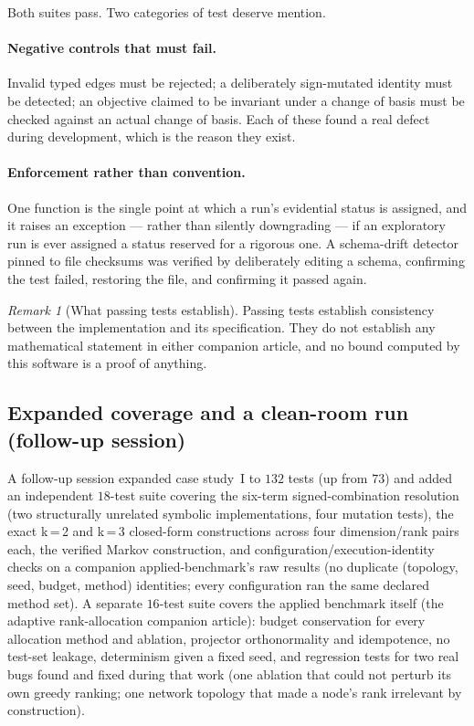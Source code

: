 \documentclass[11pt]{amsart}
\theoremstyle{remark}
\newtheorem{remark}{Remark}[section]
\begin{document}
Both suites pass. Two categories of test deserve mention.

\paragraph{Negative controls that must fail.} Invalid typed edges must be rejected; a
deliberately sign-mutated identity must be detected; an objective claimed to be invariant
under a change of basis must be checked against an actual change of basis. Each of these
found a real defect during development, which is the reason they exist.

\paragraph{Enforcement rather than convention.} One function is the single point at which a
run's evidential status is assigned, and it raises an exception --- rather than silently
downgrading --- if an exploratory run is ever assigned a status reserved for a rigorous one.
A schema-drift detector pinned to file checksums was verified by deliberately editing a
schema, confirming the test failed, restoring the file, and confirming it passed again.

\begin{remark}[What passing tests establish]
\label{rem:testscope}
Passing tests establish consistency between the implementation and its specification. They
do not establish any mathematical statement in either companion article, and no bound
computed by this software is a proof of anything.
\end{remark}

\subsection{Expanded coverage and a clean-room run (follow-up session)}

A follow-up session expanded case study~I to $132$ tests (up from $73$) and added an
independent $18$-test suite covering the six-term signed-combination resolution (two
structurally unrelated symbolic implementations, four mutation tests), the exact k\,=\,2
and k\,=\,3 closed-form constructions across four dimension/rank pairs each, the verified
Markov construction, and configuration/execution-identity checks on a companion
applied-benchmark's raw results (no duplicate (topology, seed, budget, method) identities;
every configuration ran the same declared method set). A separate $16$-test suite covers
the applied benchmark itself (the adaptive rank-allocation companion article): budget conservation for every
allocation method and ablation, projector orthonormality and idempotence, no test-set
leakage, determinism given a fixed seed, and regression tests for two real bugs found and
fixed during that work (one ablation that could not perturb its own greedy ranking; one
network topology that made a node's rank irrelevant by construction).
\end{document}
